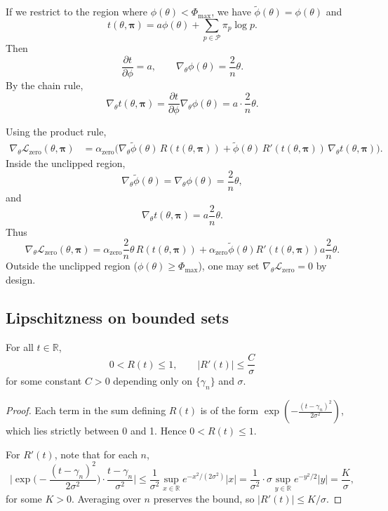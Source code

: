 \documentclass[11pt]{article}
\begin{document}
If we restrict to the region where $\phi(\theta)<\Phi_{\max}$, we have $\tilde{\phi}(\theta)=\phi(\theta)$ and
\[
  t(\theta,\bm{\pi}) = a\phi(\theta) + \sum_{p\in\mathcal{P}} \pi_p \log p.
\]
Then
\[
  \frac{\partial t}{\partial \phi} = a,\qquad
  \nabla_\theta \phi(\theta) = \frac{2}{n}\theta.
\]
By the chain rule,
\[
  \nabla_\theta t(\theta,\bm{\pi}) = \frac{\partial t}{\partial \phi}\nabla_\theta \phi(\theta)
    = a\cdot \frac{2}{n} \theta.
\]

Using the product rule,
\begin{align*}
  \nabla_\theta \mathcal{L}_{\mathrm{zero}}(\theta,\bm{\pi})
    &= \alpha_{\mathrm{zero}}
        \Big( \nabla_\theta \tilde{\phi}(\theta)\, R(t(\theta,\bm{\pi}))
             + \tilde{\phi}(\theta)\, R'(t(\theta,\bm{\pi}))\,
               \nabla_\theta t(\theta,\bm{\pi})\Big).
\end{align*}
Inside the unclipped region,
\[
  \nabla_\theta \tilde{\phi}(\theta) = \nabla_\theta \phi(\theta) = \frac{2}{n}\theta,
\]
and
\[
  \nabla_\theta t(\theta,\bm{\pi}) = a \frac{2}{n}\theta.
\]
Thus
\begin{equation}
  \nabla_\theta \mathcal{L}_{\mathrm{zero}}(\theta,\bm{\pi})
   = \alpha_{\mathrm{zero}} \frac{2}{n}\theta\, R(t(\theta,\bm{\pi}))
     + \alpha_{\mathrm{zero}} \tilde{\phi}(\theta) R'(t(\theta,\bm{\pi}))
        a \frac{2}{n}\theta.
  \label{A:eq:grad_Lzero}
\end{equation}
Outside the unclipped region ($\phi(\theta)\ge\Phi_{\max}$), one may set $\nabla_\theta\mathcal{L}_{\mathrm{zero}}=0$ by design.

\subsection{Lipschitzness on bounded sets}

\begin{lemma}
For all $t\in\mathbb{R}$,
\[
  0 < R(t) \le 1, \qquad
  |R'(t)| \le \frac{C}{\sigma}
\]
for some constant $C>0$ depending only on $\{\gamma_n\}$ and $\sigma$.
\end{lemma}

\begin{proof}
Each term in the sum defining $R(t)$ is of the form $\exp(-\frac{(t-\gamma_n)^2}{2\sigma^2})$, which lies strictly between 0 and 1. Hence $0<R(t)\le 1$.

For $R'(t)$, note that for each $n$,
\[
  \bigg|\exp\bigg(-\frac{(t-\gamma_n)^2}{2\sigma^2}\bigg)\cdot
       \frac{t-\gamma_n}{\sigma^2}\bigg|
  \le \frac{1}{\sigma^2}\sup_{x\in\mathbb{R}} e^{-x^2/(2\sigma^2)}|x|
  = \frac{1}{\sigma^2} \cdot \sigma \sup_{y\in\mathbb{R}} e^{-y^2/2}|y|
  = \frac{K}{\sigma},
\]
for some $K>0$. Averaging over $n$ preserves the bound, so $|R'(t)|\le K/\sigma$.
\end{proof}
\end{document}
